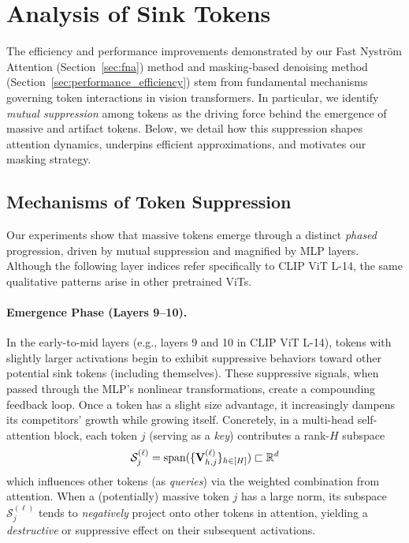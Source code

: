 \section{Analysis of Sink Tokens}
\label{sec:mechanisms}

The efficiency and performance improvements demonstrated by our Fast Nystr\"om Attention (Section~\ref{sec:fna}) method and masking-based denoising method (Section~\ref{sec:performance_efficiency}) stem from fundamental mechanisms governing token interactions in vision transformers. In particular, we identify \emph{mutual suppression} among tokens as the driving force behind the emergence of massive and artifact tokens. Below, we detail how this suppression shapes attention dynamics, underpins efficient approximations, and motivates our masking strategy.

\subsection{Mechanisms of Token Suppression}

Our experiments show that massive tokens emerge through a distinct \emph{phased} progression, driven by mutual suppression and magnified by MLP layers. Although the following layer indices refer specifically to CLIP ViT L-14, the same qualitative patterns arise in other pretrained ViTs.

\paragraph{Emergence Phase (Layers 9--10).}
In the early-to-mid layers (e.g., layers 9 and 10 in CLIP ViT L-14), tokens with slightly larger activations begin to exhibit suppressive behaviors toward other potential sink tokens (including themselves). These suppressive signals, when passed through the MLP’s nonlinear transformations, create a compounding feedback loop. Once a token has a slight size advantage, it increasingly dampens its competitors’ growth while growing itself. Concretely, in a multi-head self-attention block, each token $j$ (serving as a \emph{key}) contributes a rank-$H$ subspace
\begin{align}
    \mathcal{S}^{(\ell)}_j = \text{span}(\{\mbox{{\bfseries V}}^{(\ell)}_{h, j}\}_{h \in [H]}) \sqsubset \mathbb{R}^d
\end{align}
which influences other tokens (as \emph{queries}) via the weighted combination from attention. When a (potentially) massive token $j$ has a large norm, its subspace $\mathcal{S}_j^{(\ell)}$ tends to \emph{negatively} project onto other tokens in attention, yielding a \emph{destructive} or suppressive effect on their subsequent activations.

